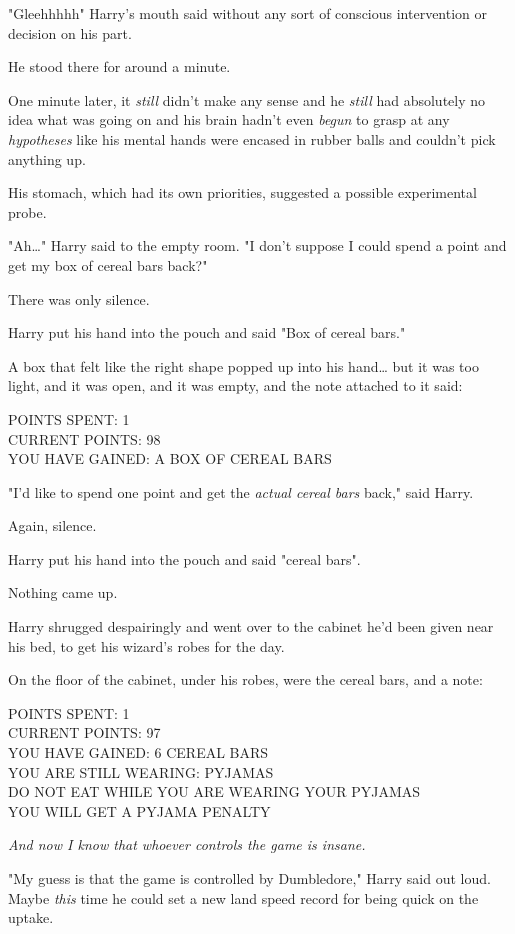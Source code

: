 "Gleehhhhh" Harry's mouth said without any sort of conscious intervention or 
decision on his part.

He stood there for around a minute.

One minute later, it \emph{still} didn't make any sense and he \emph{still} had 
absolutely no idea what was going on and his brain hadn't even \emph{begun} to 
grasp at any \emph{hypotheses} like his mental hands were encased in rubber 
balls and couldn't pick anything up.

His stomach, which had its own priorities, suggested a possible experimental 
probe.

"Ah{\ldots}" Harry said to the empty room. "I don't suppose I could spend a 
point and get my box of cereal bars back?"

There was only silence.

Harry put his hand into the pouch and said "Box of cereal bars."

A box that felt like the right shape popped up into his hand{\ldots} but it was 
too light, and it was open, and it was empty, and the note attached to it said:

POINTS SPENT: 1\\
CURRENT POINTS: 98\\
YOU HAVE GAINED: A BOX OF CEREAL BARS

"I'd like to spend one point and get the \emph{actual cereal bars} back," said 
Harry.

Again, silence.

Harry put his hand into the pouch and said "cereal bars".

Nothing came up.

Harry shrugged despairingly and went over to the cabinet he'd been given near 
his bed, to get his wizard's robes for the day.

On the floor of the cabinet, under his robes, were the cereal bars, and a note:

POINTS SPENT: 1\\
CURRENT POINTS: 97\\
YOU HAVE GAINED: 6 CEREAL BARS\\
YOU ARE STILL WEARING: PYJAMAS\\
DO NOT EAT WHILE YOU ARE WEARING YOUR PYJAMAS\\
YOU WILL GET A PYJAMA PENALTY

\emph{And now I know that whoever controls the game is insane.}

"My guess is that the game is controlled by Dumbledore," Harry said out loud. 
Maybe \emph{this} time he could set a new land speed record for being quick on 
the uptake.

